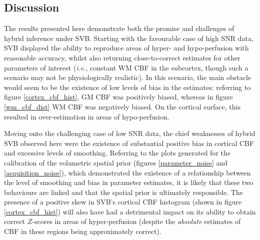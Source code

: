 \subsection{Discussion}

The results presented here demonstrate both the promise and challenges of hybrid inference under SVB. Starting with the favourable case of high SNR data, SVB displayed the ability to reproduce areas of hyper- and hypo-perfusion with reasonable accuracy, whilst also returning close-to-correct estimates for other parameters of interest (\textit{i.e.}, constant WM CBF in the subcortex, though such a scenario may not be physiologically realistic). In this scenario, the main obstacle would seem to be the existence of low levels of bias in the estimates: referring to figure \ref{cortex_cbf_hist}, GM CBF was positively biased, whereas in figure \ref{wm_cbf_dist} WM CBF was negatively biased. On the cortical surface, this resulted in over-estimation in areas of hypo-perfusion. 

Moving onto the challenging case of low SNR data, the chief weaknesses of hybrid SVB observed here were the existence of substantial positive bias in cortical CBF and excessive levels of smoothing. Referring to the plots generated for the calibration of the volumetric spatial prior (figures \ref{parameter_noise} and \ref{acquisition_noise}), which demonstrated the existence of a relationship between the level of smoothing and bias in parameter estimates, it is likely that these two behaviours are linked and that the spatial prior is ultimately responsible. The presence of a positive skew in SVB's cortical CBF histogram (shown in figure \ref{cortex_cbf_hist}) will also have had a detrimental impact on its ability to obtain correct $Z$-scores in areas of hyper-perfusion (despite the \textit{absolute} estimates of CBF in these regions being approximately correct). 


